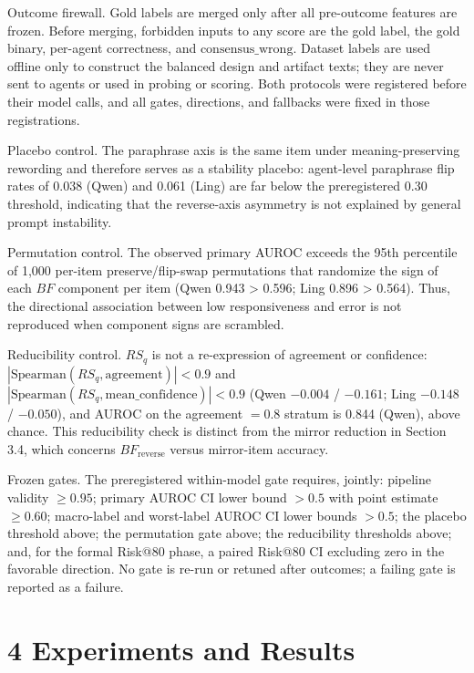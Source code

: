 \documentclass[11pt]{article}
\begin{document}
Outcome firewall. Gold labels are merged only after all pre-outcome features are frozen. Before merging, forbidden inputs to any score are the gold label, the gold binary, per-agent correctness, and $\mathrm{consensus\_wrong}$. Dataset labels are used offline only to construct the balanced design and artifact texts; they are never sent to agents or used in probing or scoring. Both protocols were registered before their model calls, and all gates, directions, and fallbacks were fixed in those registrations.

Placebo control. The paraphrase axis is the same item under meaning-preserving rewording and therefore serves as a stability placebo: agent-level paraphrase flip rates of 0.038 (Qwen) and 0.061 (Ling) are far below the preregistered 0.30 threshold, indicating that the reverse-axis asymmetry is not explained by general prompt instability.

Permutation control. The observed primary AUROC exceeds the 95th percentile of 1,000 per-item preserve/flip-swap permutations that randomize the sign of each $BF$ component per item (Qwen 0.943 > 0.596; Ling 0.896 > 0.564). Thus, the directional association between low responsiveness and error is not reproduced when component signs are scrambled.

Reducibility control. $RS_q$ is not a re-expression of agreement or confidence: $|\mathrm{Spearman}(RS_q, \mathrm{agreement})| < 0.9$ and $|\mathrm{Spearman}(RS_q, \mathrm{mean\_confidence})| < 0.9$ (Qwen $-0.004$ / $-0.161$; Ling $-0.148$ / $-0.050$), and AUROC on the agreement $= 0.8$ stratum is 0.844 (Qwen), above chance. This reducibility check is distinct from the mirror reduction in Section 3.4, which concerns $BF_{\mathrm{reverse}}$ versus mirror-item accuracy.

Frozen gates. The preregistered within-model gate requires, jointly: pipeline validity $\geq 0.95$; primary AUROC CI lower bound $> 0.5$ with point estimate $\geq 0.60$; macro-label and worst-label AUROC CI lower bounds $> 0.5$; the placebo threshold above; the permutation gate above; the reducibility thresholds above; and, for the formal Risk@80 phase, a paired Risk@80 CI excluding zero in the favorable direction. No gate is re-run or retuned after outcomes; a failing gate is reported as a failure.


\section{4 Experiments and Results}
\end{document}
